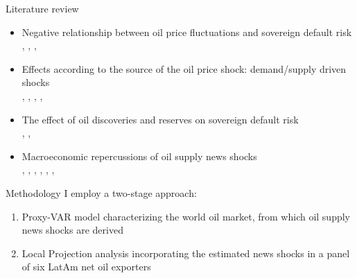 \documentclass[compress,11pt,aspectratio=43]{beamer}
\begin{document}
\begin{frame}{Literature review}
\begin{itemize}
    \item \textcolor{myblue}{Negative relationship between oil price fluctuations and sovereign default risk} \\
    {\footnotesize \citet{wegener2016oil}, \citet{pavlova2018dynamic}, \citet{chuffart2019investigation}, \citet{bouri2020oil}}
    \item \textcolor{myblue}{Effects according to the source of the oil price shock: demand/supply driven shocks} \\
    {\footnotesize \citet{filippidis2020oil}, \citet{alturki2021impact}, \citet{chen2022oil}, \citet{alsalman2023oilb}, \citet{kumar2024oil}}
    \item \textcolor{myblue}{The effect of oil discoveries and reserves on sovereign default risk} \\ 
    {\footnotesize \citet{hooper2015oil}, \citet{hamann2023natural}, \citet{esquivel2023sovereign}}
    \item \textcolor{myblue}{Macroeconomic repercussions of oil supply news shocks} \\ {\footnotesize \citet{kanzig2021macroeconomic}, \citet{caraiani2022impact}, \citet{liu2022oil}, \citet{alsalman2023oil}, \citet{miyamoto2023oil}, \citet{drossidis2024distributional}, \citet{sardar2024revisiting}} 
\end{itemize}    
\end{frame}
\begin{frame}[label=methodology]{Methodology}
I employ a two-stage approach:
    \begin{enumerate}
        \item Proxy-VAR model characterizing the world oil market, from which oil supply news shocks are derived \hyperlink{1ststage}{\beamerbutton{$\boldsymbol{\Rightarrow}$}}
        \item Local Projection analysis incorporating the estimated news shocks in a panel of six LatAm net oil exporters \hyperlink{2ndstage}{\beamerbutton{$\boldsymbol{\Rightarrow}$}}
    \end{enumerate}
\end{frame}
\end{document}
